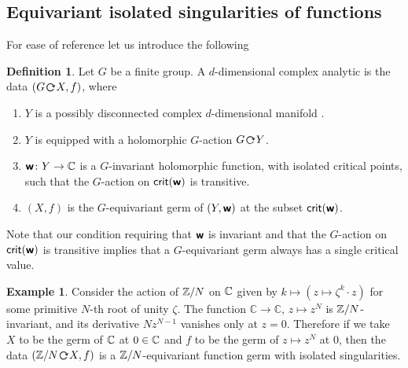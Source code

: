 \documentclass[twoside,leqno]{article}
\numberwithin{equation}{section}
\theoremstyle{plain}
\theoremstyle{definition}
\newtheorem{definition}[equation]{Definition}
\newtheorem{example}[equation]{Example}
\begin{document}
\subsection{Equivariant isolated singularities of functions} \label{sec:equiv.singf}

For ease of reference let us introduce the following 

\begin{definition}\label{def:G-equivariant isolated singularity} Let $G$ be a finite group. 
A $d$-dimensional complex analytic   is the data $\left(G \, \actleft \, X,f\right)$, where
\begin{enumerate}[wide]
    \item $Y$ is a possibly disconnected complex $d$-dimensional manifold .
    \item $Y$ is equipped with a holomorphic $G$-action $G\, \actleft \, Y$.
    \item $\boldsymbol{\mathsf{w}} \colon  Y \to \mathbb C$ is a $G$-invariant holomorphic function, with isolated critical points, such that the $G$-action on $\mathsf{crit}(\boldsymbol{\mathsf{w}})$ is transitive.
    \item $(X,f)$ is the $G$-equivariant germ of $(Y,\boldsymbol{\mathsf{w}})$ at the subset $\mathsf{crit}(\boldsymbol{\mathsf{w}})$.
\end{enumerate}
\end{definition}

Note that our condition requiring that $\boldsymbol{\mathsf{w}}$ is invariant and that the $G$-action on $\mathsf{crit}(\boldsymbol{\mathsf{w}})$ is transitive implies that a $G$-equivariant germ always has a single critical value.

\begin{example}
Consider the action of $\mathbb Z/N$ on $\mathbb C$  given  by  $k \mapsto (z \mapsto \zeta^{k}\cdot z)$ for some primitive $N$-th root of unity $\zeta$. The function
$\mathbb{C} \to \mathbb{C}$, $z \mapsto z^N$
is $\mathbb Z/N$-invariant, and its derivative $Nz^{N-1}$ vanishes only at $z=0$. 
Therefore if we take 
$X$ to be the germ of  $\mathbb C$ at $0 \in \mathbb C$ and $f$ to be the  germ of $z \mapsto z^N$ at $0$, then the data $\left({\bbZ/N}\, \actleft \, X,f \right)$  is a $\mathbb Z/N$-equivariant function germ with isolated singularities.
\end{example}
\end{document}
